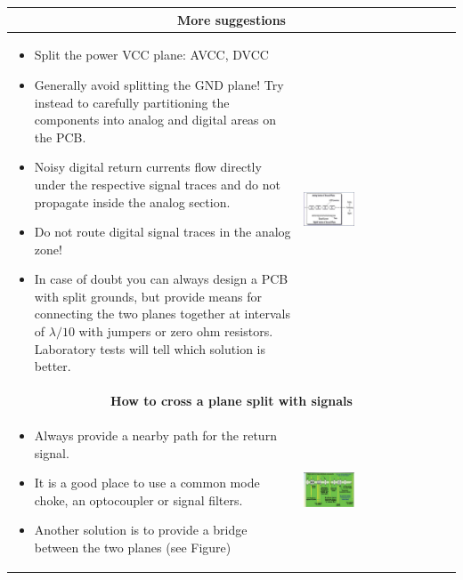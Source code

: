 				\begin{table}[h!]
				\centering
				\begin{tabular}{|m{}|m{}|}

						\multicolumn{2}{c}{\textbf{More suggestions}}
					\\
					\hline
						\begin{itemize}
							\item Split the power VCC plane: AVCC, DVCC
							\item Generally avoid splitting the GND plane! Try instead to carefully partitioning the components into analog and digital areas on the PCB. 
							\item Noisy digital return currents flow directly under the respective signal traces and do not propagate inside the analog section. 
							\item Do not route digital signal traces in the analog zone! 
							\item In case of doubt you can always design a PCB with split grounds, but provide means for connecting the two planes together at intervals of $\lambda/10$ with jumpers or zero ohm resistors. Laboratory tests will tell which solution is better. 
						\end{itemize}
					& 
						\begin{center}\includegraphics[width=0.35\textwidth]{images/PlaneSplit.png}\end{center}  
					\\	
					\hline
						\multicolumn{2}{c}{\textbf{How to cross a plane split with signals}}
					\\
					\hline
						\begin{itemize}
							\item Always provide a nearby path for the return signal. 
							\item It is a good place to use a common mode choke, an optocoupler or signal filters. 
							\item Another solution is to provide a bridge between the two planes (see Figure)
						\end{itemize}
					& 
						\begin{center}\includegraphics[width=0.35\textwidth]{images/CrossSplitPlane.png}\end{center}  
					\\	
					\hline
					\end{tabular}
				\end{table}	
				
